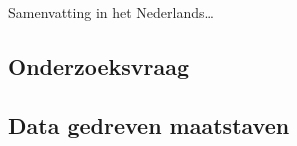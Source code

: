 {



Samenvatting in het Nederlands\ldots










\subsection*{Onderzoeksvraag}



\subsection*{Data gedreven maatstaven}

}
